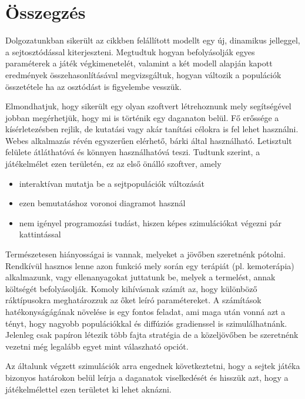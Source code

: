 \chapter{Összegzés}

Dolgozatunkban sikerült az \cite{archetti2016cooperation} cikkben felállított modellt egy új, dinamikus jelleggel, a sejtosztódással kiterjeszteni. Megtudtuk hogyan befolyásolják egyes paraméterek a játék végkimenetelét, valamint a két modell alapján kapott eredmények összehasonlításával megvizsgáltuk, hogyan változik a populációk összetétele ha az osztódást is figyelembe vesszük.

Elmondhatjuk, hogy sikerült egy olyan szoftvert létrehoznunk mely segítségével jobban megérhetjük, hogy mi is történik egy daganaton belül. Fő erőssége a kísérletezésben rejlik, de kutatási vagy akár tanítási célokra is fel lehet használni. Webes alkalmazás révén egyszerűen elérhető, bárki által használható. Letisztult felülete átláthatóvá és könnyen használhatóvá teszi. Tudtunk szerint, a játékelmélet ezen területén, ez az első önálló szoftver, amely 
\begin{itemize}
	\item interaktívan mutatja be a sejtpopulációk változását
	\item ezen bemutatáshoz voronoi diagramot használ
	\item nem igényel programozási tudást, hiszen képes szimulációkat végezni pár kattintással
\end{itemize}

Természetesen hiányosságai is vannak, melyeket a jövőben szeretnénk pótolni. Rendkívül hasznos lenne azon funkció mely során egy terápiát (pl. kemoterápia) alkalmazunk, vagy ellenanyagokat juttatunk be, melyek a termelést, annak költségét befolyásolják. Komoly kihívásnak számít az, hogy különböző ráktípusokra meghatározzuk az őket leíró paramétereket. A számítások hatékonyságágának növelése is egy fontos feladat, ami maga után vonná azt a tényt, hogy nagyobb populációkkal és diffúziós gradienssel is szimulálhatnánk. 
Jelenleg csak papíron létezik több fajta stratégia \cite{hummert2014evolutionary} de a közeljövőben be szeretnénk vezetni még legalább egyet mint válaszható opciót.

Az általunk végzett szimulációk arra engednek következtetni, hogy a sejtek játéka bizonyos határokon belül leírja a daganatok viselkedését és hisszük azt, hogy a játékelmélettel ezen területet ki lehet aknázni.
